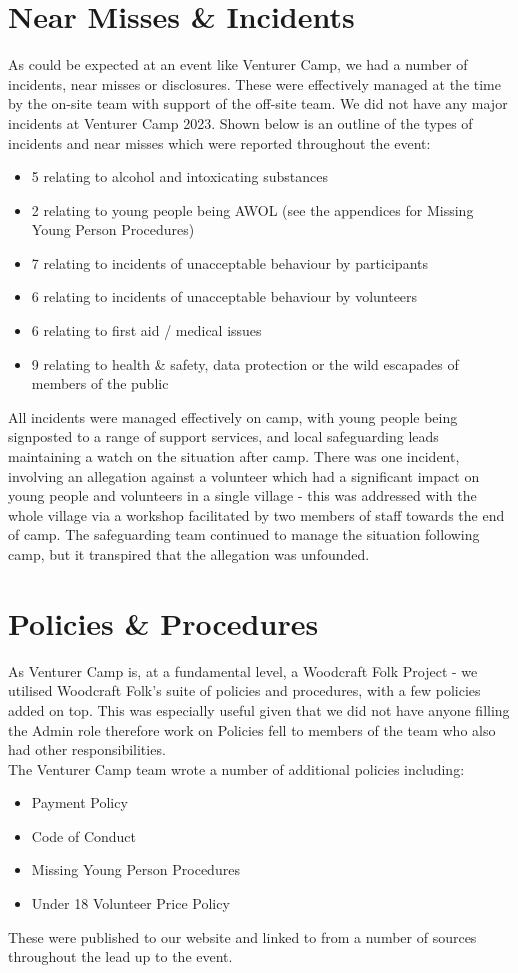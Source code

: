 \section{Near Misses \& Incidents}
As could be expected at an event like Venturer Camp, we had a number of incidents, near misses or disclosures. These were effectively managed at the time by the on-site team with support of the off-site team. We did not have any major incidents at Venturer Camp 2023. Shown below is an outline of the types of incidents and near misses which were reported throughout the event:
\begin{itemize}
    \item 5 relating to alcohol and intoxicating substances
    \item 2 relating to young people being AWOL (see the appendices for Missing Young Person Procedures)
    \item 7 relating to incidents of unacceptable behaviour by participants
    \item 6 relating to incidents of unacceptable behaviour by volunteers
    \item 6 relating to first aid / medical issues
    \item 9 relating to health \& safety, data protection or the wild escapades of members of the public
\end{itemize}
All incidents were managed effectively on camp, with young people being signposted to a range of support services, and local safeguarding leads maintaining a watch on the situation after camp. There was one incident, involving an allegation against a volunteer which had a significant impact on young people and volunteers in a single village - this was addressed with the whole village via a workshop facilitated by two members of staff towards the end of camp. The safeguarding team continued to manage the situation following camp, but it transpired that the allegation was unfounded.

\section{Policies \& Procedures}
As Venturer Camp is, at a fundamental level, a Woodcraft Folk Project - we utilised Woodcraft Folk's suite of policies and procedures, with a few policies added on top. This was especially useful given that we did not have anyone filling the Admin role therefore work on Policies fell to members of the team who also had other responsibilities.\\

The Venturer Camp team wrote a number of additional policies including:
\begin{itemize}
    \item Payment Policy
    \item Code of Conduct
    \item Missing Young Person Procedures
    \item Under 18 Volunteer Price Policy
\end{itemize}
These were published to our website and linked to from a number of sources throughout the lead up to the event.
